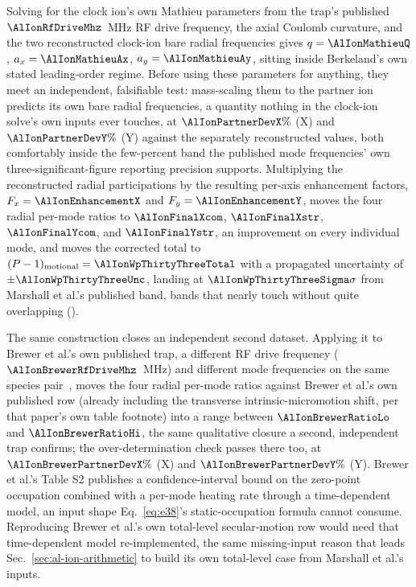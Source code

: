 \documentclass[aps,pra,superscriptaddress,groupedaddress,nofootinbib]{revtex4-2}
\begin{document}
Solving for the clock ion's own Mathieu parameters from the trap's
published $\AlIonRfDriveMhz$~MHz RF drive frequency, the axial Coulomb
curvature, and the two reconstructed clock-ion bare radial frequencies
gives $q=\AlIonMathieuQ$, $a_x=\AlIonMathieuAx$, $a_y=\AlIonMathieuAy$,
sitting inside Berkeland's own stated leading-order regime. Before using
these parameters for anything, they meet an independent, falsifiable test:
mass-scaling them to the partner ion predicts its own bare radial
frequencies, a quantity nothing in the clock-ion solve's own inputs ever
touches, at $\AlIonPartnerDevX\%$ (X) and $\AlIonPartnerDevY\%$ (Y) against
the separately reconstructed values, both comfortably inside the
few-percent band the published mode frequencies' own three-significant-figure
reporting precision supports. Multiplying the reconstructed radial
participations by the resulting per-axis enhancement factors,
$F_x=\AlIonEnhancementX$ and $F_y=\AlIonEnhancementY$, moves the four
radial per-mode ratios to $\AlIonFinalXcom$, $\AlIonFinalXstr$,
$\AlIonFinalYcom$, and $\AlIonFinalYstr$, an improvement on every
individual mode, and moves the corrected total to
$(P-1)_{\rm motional}=\AlIonWpThirtyThreeTotal$ with a propagated
uncertainty of $\pm\AlIonWpThirtyThreeUnc$, landing at
$\AlIonWpThirtyThreeSigma\sigma$ from Marshall et al.'s published band,
bands that nearly touch without quite overlapping
(\textit{\AlIonWpThirtyThreeVerdict}).

The same construction closes an independent second dataset. Applying it to
Brewer et al.'s own published trap, a different RF drive frequency
($\AlIonBrewerRfDriveMhz$~MHz) and different mode frequencies on the same
species pair~\cite{Brewer2019}, moves the four radial per-mode ratios
against Brewer et al.'s own published row (already including the
transverse intrinsic-micromotion shift, per that paper's own table
footnote) into a range between $\AlIonBrewerRatioLo$ and $\AlIonBrewerRatioHi$, the
same qualitative closure a second, independent trap confirms; the
over-determination check passes there too, at $\AlIonBrewerPartnerDevX\%$
(X) and $\AlIonBrewerPartnerDevY\%$ (Y). Brewer et al.'s Table S2 publishes
a confidence-interval bound on the zero-point occupation combined with a
per-mode heating rate through a time-dependent model, an input shape
Eq.~\eqref{eq:e38}'s static-occupation formula cannot consume.
Reproducing Brewer et al.'s own total-level secular-motion row would need
that time-dependent model re-implemented, the same missing-input reason
that leads Sec.~\ref{sec:al-ion-arithmetic} to build its own total-level
case from Marshall et al.'s inputs.
\end{document}
